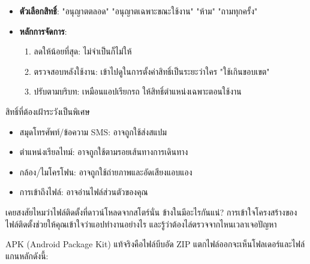 \begin{itemize}
  \item \textbf{ตัวเลือกสิทธิ์}: "อนุญาตตลอด" "อนุญาตเฉพาะขณะใช้งาน" "ห้าม" "ถามทุกครั้ง"
  \item \textbf{หลักการจัดการ}:
  \begin{enumerate}
    \item ลดให้น้อยที่สุด: ไม่จำเป็นก็ไม่ให้
    \item ตรวจสอบหลังใช้งาน: เข้าไปดูในการตั้งค่าสิทธิ์เป็นระยะว่าใคร "ใช้เกินขอบเขต"
    \item ปรับตามบริบท: เหมือนแอปเรียกรถ ให้สิทธิ์ตำแหน่งเฉพาะตอนใช้งาน
  \end{enumerate}
\end{itemize}

\begin{tcbwarn}{สิทธิ์ที่ต้องเฝ้าระวังเป็นพิเศษ}
\begin{itemize}
  \item สมุดโทรศัพท์/ข้อความ SMS: อาจถูกใช้ส่งสแปม
  \item ตำแหน่งเรียลไทม์: อาจถูกใช้ตามรอยเส้นทางการเดินทาง
  \item กล้อง/ไมโครโฟน: อาจถูกใช้ถ่ายภาพและอัดเสียงแอบแอง
  \item การเข้าถึงไฟล์: อาจอ่านไฟล์ส่วนตัวของคุณ
\end{itemize}

\end{tcbwarn}

เคยสงสัยไหมว่าไฟล์ติดตั้งที่ดาวน์โหลดจากสโตร์นั่น ข้างในมีอะไรกันแน่? การเข้าใจโครงสร้างของไฟล์ติดตั้งช่วยให้คุณเข้าใจว่าแอปทำงานอย่างไร และรู้ว่าต้องไล่ตรวจจากไหนเวลาเจอปัญหา


APK (Android Package Kit) แท้จริงคือไฟล์บีบอัด ZIP แตกไฟล์ออกจะเห็นโฟลเดอร์และไฟล์แกนหลักดังนี้:

